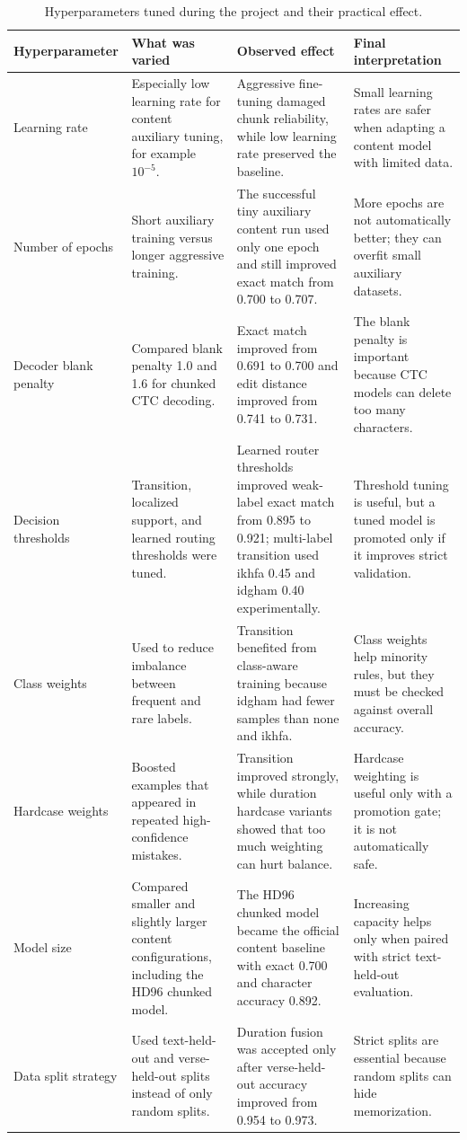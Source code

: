\documentclass[12pt,a4paper]{report}
\begin{document}
\begin{table}[H]
\centering
\small
\begin{tabularx}{\textwidth}{p{} p{} p{} X}
\toprule
\textbf{Hyperparameter} & \textbf{What was varied} & \textbf{Observed effect} & \textbf{Final interpretation} \\
\midrule
Learning rate &
Especially low learning rate for content auxiliary tuning, for example
$10^{-5}$. &
Aggressive fine-tuning damaged chunk reliability, while low learning rate
preserved the baseline. &
Small learning rates are safer when adapting a content model with limited data. \\
\midrule
Number of epochs &
Short auxiliary training versus longer aggressive training. &
The successful tiny auxiliary content run used only one epoch and still improved
exact match from 0.700 to 0.707. &
More epochs are not automatically better; they can overfit small auxiliary
datasets. \\
\midrule
Decoder blank penalty &
Compared blank penalty 1.0 and 1.6 for chunked CTC decoding. &
Exact match improved from 0.691 to 0.700 and edit distance improved from 0.741
to 0.731. &
The blank penalty is important because CTC models can delete too many
characters. \\
\midrule
Decision thresholds &
Transition, localized support, and learned routing thresholds were tuned. &
Learned router thresholds improved weak-label exact match from 0.895 to 0.921;
multi-label transition used ikhfa 0.45 and idgham 0.40 experimentally. &
Threshold tuning is useful, but a tuned model is promoted only if it improves
strict validation. \\
\midrule
Class weights &
Used to reduce imbalance between frequent and rare labels. &
Transition benefited from class-aware training because idgham had fewer samples
than none and ikhfa. &
Class weights help minority rules, but they must be checked against overall
accuracy. \\
\midrule
Hardcase weights &
Boosted examples that appeared in repeated high-confidence mistakes. &
Transition improved strongly, while duration hardcase variants showed that too
much weighting can hurt balance. &
Hardcase weighting is useful only with a promotion gate; it is not automatically
safe. \\
\midrule
Model size &
Compared smaller and slightly larger content configurations, including the HD96
chunked model. &
The HD96 chunked model became the official content baseline with exact 0.700
and character accuracy 0.892. &
Increasing capacity helps only when paired with strict text-held-out evaluation. \\
\midrule
Data split strategy &
Used text-held-out and verse-held-out splits instead of only random splits. &
Duration fusion was accepted only after verse-held-out accuracy improved from
0.954 to 0.973. &
Strict splits are essential because random splits can hide memorization. \\
\bottomrule
\end{tabularx}
\caption{Hyperparameters tuned during the project and their practical effect.}
\label{tab:hyperparameter_summary}
\end{table}
\end{document}
